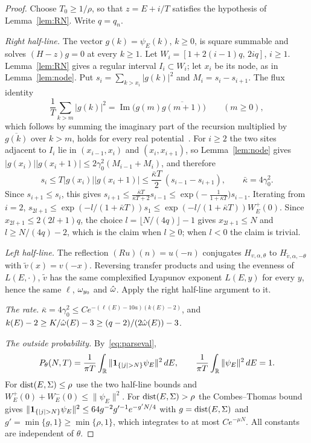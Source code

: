 \begin{proof}
Choose $T_0\ge1/\rho$, so that $z=E+i/T$ satisfies the hypothesis of Lemma~\ref{lem:RN}. Write $q=q_n$.

\emph{Right half-line.} The vector $g(k)=\psi_E(k)$, $k\ge0$, is square summable and solves $(H-z)g=0$ at every $k\ge1$. Let $W_i=[1+2(i-1)q,\,2iq]$, $i\ge1$. Lemma~\ref{lem:RN} gives a regular interval $I_i\subset W_i$; let $x_i$ be its node, as in Lemma~\ref{lem:node}. Put $s_i=\sum_{k>x_i}|g(k)|^2$ and $M_i=s_i-s_{i+1}$. The flux identity
\[
\frac1T\sum_{k>m}|g(k)|^2=\operatorname{Im}\bigl(g(m)\overline{g(m+1)}\bigr)\qquad(m\ge0),
\]
which follows by summing the imaginary part of the recursion multiplied by $\overline{g(k)}$ over $k>m$, holds for every real potential~\cite[proof of Lemma~9.6]{DMamo}. For $i\ge2$ the two sites adjacent to $I_i$ lie in $(x_{i-1},x_i)$ and $(x_i,x_{i+1})$, so Lemma~\ref{lem:node} gives $|g(x_i)||g(x_i+1)|\le2\gamma_0^2(M_{i-1}+M_i)$, and therefore
\[
s_i\le T|g(x_i)||g(x_i+1)|\le\frac{\bar\kappa T}2\,(s_{i-1}-s_{i+1}),\qquad\bar\kappa=4\gamma_0^2.
\]
Since $s_{i+1}\le s_i$, this gives $s_{i+1}\le\frac{\bar\kappa T}{\bar\kappa T+2}s_{i-1}\le\exp\bigl(-\frac1{1+\bar\kappa T}\bigr)s_{i-1}$. Iterating from $i=2$, $s_{2l+1}\le\exp(-l/(1+\bar\kappa T))s_1\le\exp(-l/(1+\bar\kappa T))W^+_E(0)$. Since $x_{2l+1}\le2(2l+1)q$, the choice $l=\lfloor N/(4q)\rfloor-1$ gives $x_{2l+1}\le N$ and $l\ge N/(4q)-2$, which is the claim when $l\ge0$; when $l<0$ the claim is trivial.

\emph{Left half-line.} The reflection $(Ru)(n)=u(-n)$ conjugates $H_{v,\alpha,\theta}$ to $H_{\tilde v,\alpha,-\theta}$ with $\tilde v(x)=v(-x)$. Reversing transfer products and using the evenness of $L(E,\cdot)$, $\tilde v$ has the same complexified Lyapunov exponent $L(E,y)$ for every $y$, hence the same $\ell$, $\omega_{y_0}$ and $\hat\omega$. Apply the right half-line argument to it.

\emph{The rate.} $\bar\kappa=4\gamma_0^2\le Ce^{-(\ell(E)-10a)(k(E)-2)}$, and $k(E)-2\ge K/\hat\omega(E)-3\ge(q-2)/(2\hat\omega(E))-3$.

\emph{The outside probability.} By~\eqref{eq:parseval},
\[
P_\theta(N,T)=\frac1{\pi T}\int_\R\|\un_{\{|j|>N\}}\psi_E\|^2\,dE,\qquad\frac1{\pi T}\int_\R\|\psi_E\|^2\,dE=1.
\] For $\operatorname{dist}(E,\Sigma)\le\rho$ use the two half-line bounds and $W^+_E(0)+W^-_E(0)\le\|\psi_E\|^2$. For $\operatorname{dist}(E,\Sigma)>\rho$ the Combes--Thomas bound~\cite[Theorem~5.15(3)]{DMuniv} gives $\|\un_{\{|j|>N\}}\psi_E\|^2\le64g^{-2}g'^{-1}e^{-g'N/4}$ with $g=\operatorname{dist}(E,\Sigma)$ and $g'=\min\{g,1\}\ge\min\{\rho,1\}$, which integrates to at most $Ce^{-\mu N}$. All constants are independent of $\theta$.
\end{proof}

